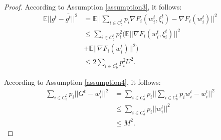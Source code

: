 \begin{proof}
According to Assumption \ref{assumption3}, it follows:
\begin{equation}
    \begin{split}\label{ineq7}
	\mathbb{E}||g^t-\bar{g^t}||^2
	& = \mathbb{E}||\sum\limits_{i \in C_b^t}p_i\nabla F_i(w_i^t,\xi_i^t)-\nabla F_i(w_i^t)||^2 \\
	& \leq \sum\limits_{i \in C_b^t}p_i^2 (\mathbb{E}||\nabla F_i(w_i^t,\xi_i^t)||^2 \\
        & +\mathbb{E}||\nabla F_i(w_i^t)||^2) \\
	&\leq 2\sum\limits_{i \in C_b^t}p_i^2 U^2.
    \end{split} 
\end{equation}


According to Assumption \ref{assumption4}, it follows:
\begin{equation}\label{ineq8}
    \begin{split}
	\sum\limits_{i \in C_b^t}p_i||G^t-w_i^t||^2
	& = \sum\limits_{i \in C_b^t}p_i||\sum\limits_{i \in C_b^t}p_i w_i^t-w_i^t||^2 \\
	& \leq \sum\limits_{i \in C_b^t}p_i || w_i^t||^2 \\
	& \leq M^2.
    \end{split}
\end{equation}


\end{proof}

